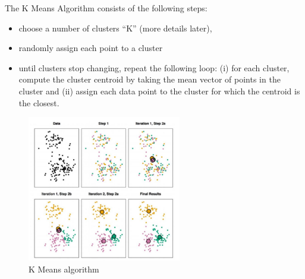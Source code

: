 \documentclass[12pt]{article}
\begin{document}
The K Means Algorithm consists of the following steps:
\begin{itemize}
	\item choose a number of clusters “K” (more details later),
	\item randomly assign each point to a cluster
	\item until clusters stop changing, repeat the following loop: (i) for each cluster, compute the cluster centroid by taking the mean vector of points in the cluster and (ii) assign each data point to the cluster for which the centroid is the closest.
\end{itemize}
\begin{figure}[htbp] 
	\centering
	\includegraphics[width=0.6\textwidth]{pics/k_means_algo_loop}
	\caption{K Means algorithm} 
\end{figure}
\end{document}
